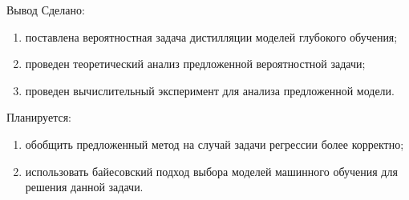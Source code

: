 \documentclass[9pt,pdf,hyperref={unicode}]{beamer}
\begin{document}
\begin{frame}{Вывод}
\justifying
Сделано:
	\begin{enumerate}
	\justifying
		\item поставлена вероятностная задача дистилляции моделей глубокого обучения;
		\item проведен теоретический анализ предложенной вероятностной задачи;
		\item проведен вычислительный эксперимент для анализа предложенной модели.
	\end{enumerate}

Планируется:
	\begin{enumerate}
	\justifying
		\item обобщить предложенный метод на случай задачи регрессии более корректно;
		\item использовать байесовский подход выбора моделей машинного обучения для решения данной задачи.
	\end{enumerate}	

\end{frame}
\end{document}

